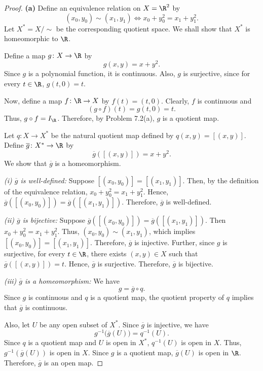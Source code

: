 
\begin{proof}
\textbf{(a)} Define an equivalence relation on $X=\R^2$ by
\[ (x_0,y_0)\sim(x_1,y_1)\iff x_0+y_0^2=x_1+y_1^2. \]
Let $X^*=X/{\sim}$ be the corresponding quotient space. We shall show that $X^*$ is
homeomorphic to $\R$.

Define a map $g\colon X\to\R$ by
\[ g(x,y)=x+y^2. \]
Since $g$ is a polynomial function, it is continuous. Also, $g$ is surjective, since for every
$t\in\R$, $g(t,0)=t$.

Now, define a map $f\colon\R\to X$ by $f(t)=(t,0)$. Clearly, $f$ is continuous and
\[ (g\circ f)(t)=g(t,0)=t. \]
Thus, $g\circ f=I_\R$. Therefore, by Problem 7.2(a), $g$ is a quotient map.

Let $q\colon X\to X^*$ be the natural quotient map defined by $q(x,y)=[(x,y)]$. Define
$\overline g\colon X^*\to\R$ by
\[ \overline g([(x,y)])=x+y^2. \]
We show that $\overline g$ is a homeomorphism.

\textit{(i) $\overline g$ is well-defined:}
Suppose $[(x_0,y_0)]=[(x_1,y_1)]$. Then, by the definition of the equivalence relation,
$x_0+y_0^2=x_1+y_1^2$. Hence,
$\overline g([(x_0,y_0)])=\overline g([(x_1,y_1)])$. Therefore, $\overline g$ is well-defined.

\textit{(ii) $\overline g$ is bijective:}
Suppose $\overline g([(x_0,y_0)])=\overline g([(x_1,y_1)])$. Then $x_0+y_0^2=x_1+y_1^2$. Thus,
$(x_0,y_0)\sim(x_1,y_1)$, which implies $[(x_0,y_0)]=[(x_1,y_1)]$. Therefore, $\overline g$ is
injective. Further, since $g$ is surjective, for every $t\in\R$, there exists $(x,y)\in X$ such
that $\overline g([(x,y)])=t$. Hence, $\overline g$ is surjective. Therefore, $\overline g$ is
bijective.

\textit{(iii) $\overline g$ is a homeomorphism:}
We have
\[ g=\overline g\circ q. \]
Since $g$ is continuous and $q$ is a quotient map, the quotient property of $q$ implies that
$\overline g$ is continuous.

Also, let $U$ be any open subset of $X^*$. Since $\overline g$ is injective, we have
\[ g^{-1}\bigl(\overline g(U)\bigr)=q^{-1}(U). \]
Since $q$ is a quotient map and $U$ is open in $X^*$, $q^{-1}(U)$ is open in $X$. Thus,
$g^{-1}(\overline g(U))$ is open in $X$. Since $g$ is a quotient map, $\overline g(U)$ is open
in $\R$. Therefore, $\overline g$ is an open map.


\end{proof}
